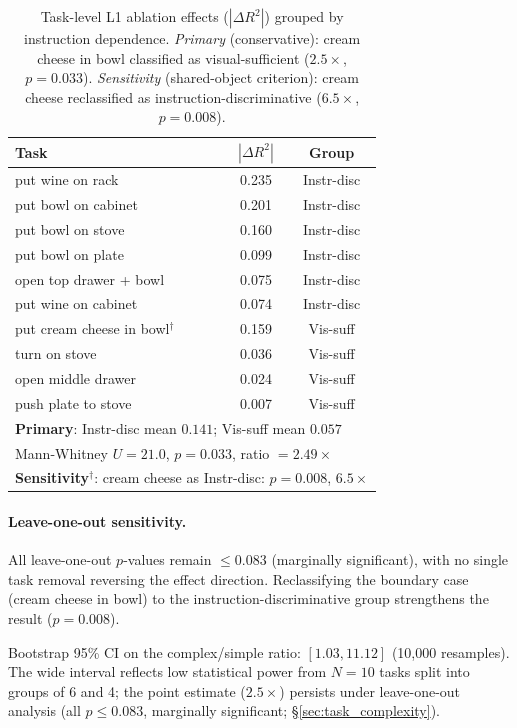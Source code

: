 \begin{table}[h]
\centering
\caption{Task-level L1 ablation effects ($|\Delta R^2|$) grouped by instruction dependence. \emph{Primary} (conservative): cream cheese in bowl classified as visual-sufficient ($2.5\times$, $p = 0.033$). \emph{Sensitivity} (shared-object criterion): cream cheese reclassified as instruction-discriminative ($6.5\times$, $p = 0.008$).}
\label{tab:task_complexity}
\small
\begin{tabular}{lcc}
\toprule
\textbf{Task} & \textbf{$|\Delta R^2|$} & \textbf{Group} \\
\midrule
put wine on rack & 0.235 & Instr-disc \\
put bowl on cabinet & 0.201 & Instr-disc \\
put bowl on stove & 0.160 & Instr-disc \\
put bowl on plate & 0.099 & Instr-disc \\
open top drawer + bowl & 0.075 & Instr-disc \\
put wine on cabinet & 0.074 & Instr-disc \\
\midrule
put cream cheese in bowl$^\dagger$ & 0.159 & Vis-suff \\
turn on stove & 0.036 & Vis-suff \\
open middle drawer & 0.024 & Vis-suff \\
push plate to stove & 0.007 & Vis-suff \\
\midrule
\multicolumn{3}{l}{\textbf{Primary}: Instr-disc mean $0.141$; Vis-suff mean $0.057$} \\
\multicolumn{3}{l}{Mann-Whitney $U = 21.0$, $p = 0.033$, ratio $= 2.49\times$} \\
\multicolumn{3}{l}{\textbf{Sensitivity}$^\dagger$: cream cheese as Instr-disc: $p = 0.008$, $6.5\times$} \\
\bottomrule
\end{tabular}
\end{table}

\paragraph{Leave-one-out sensitivity.}
All leave-one-out $p$-values remain $\leq 0.083$ (marginally significant), with no single task removal reversing the effect direction.
Reclassifying the boundary case (cream cheese in bowl) to the instruction-discriminative group strengthens the result ($p = 0.008$).

Bootstrap 95\% CI on the complex/simple ratio: $[1.03, 11.12]$ (10{,}000 resamples). The wide interval reflects low statistical power from $N=10$ tasks split into groups of 6 and 4; the point estimate ($2.5\times$) persists under leave-one-out analysis (all $p \leq 0.083$, marginally significant; \S\ref{sec:task_complexity}).

